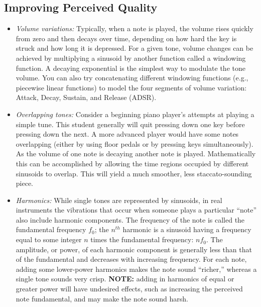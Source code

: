 \documentclass[12pt]{article}
\begin{document}
\subsection{Improving Perceived Quality}
\begin{itemize}
\item \textit{Volume variations:} Typically, when a note is played, the volume rises quickly from zero and then decays over time, depending on how hard the key is struck and how long it is depressed. For a given tone, volume changes can be achieved by multiplying a sinusoid by another function called a windowing function. A decaying exponential is the simplest way to modulate the tone volume. You can also try concatenating different windowing functions (e.g., piecewise linear functions) to model the four segments of volume variation: Attack, Decay, Sustain, and Release (ADSR).  

\item \textit{Overlapping tones:} Consider a beginning piano player’s attempts at playing a simple tune. This student generally will quit pressing down one key before pressing down the next. A more advanced player would have some notes overlapping (either by using floor pedals or by pressing keys simultaneously). As the volume of one note is decaying another note is played. Mathematically this can be accomplished by allowing the time regions occupied by different sinusoids to overlap. This will yield a much smoother, less staccato-sounding piece.

\item \textit{Harmonics:} While single tones are represented by sinusoids, in real instruments the vibrations that occur when someone plays a particular ``note'' also include harmonic components. The frequency of the note is called the fundamental frequency $f_0$; the $n^{th}$ harmonic is a sinusoid having a frequency equal to some integer $n$ times the fundamental frequency: $nf_0$. The amplitude, or power, of each harmonic component is generally less than that of the fundamental and decreases with increasing frequency. For each note, adding some lower-power harmonics makes the note sound ``richer,'' whereas a single tone sounds very crisp. \textbf{NOTE:} adding in harmonics of equal or greater power will have undesired effects, such as increasing the perceived note fundamental, and may make the note sound harsh.

\end{itemize}
\end{document}
